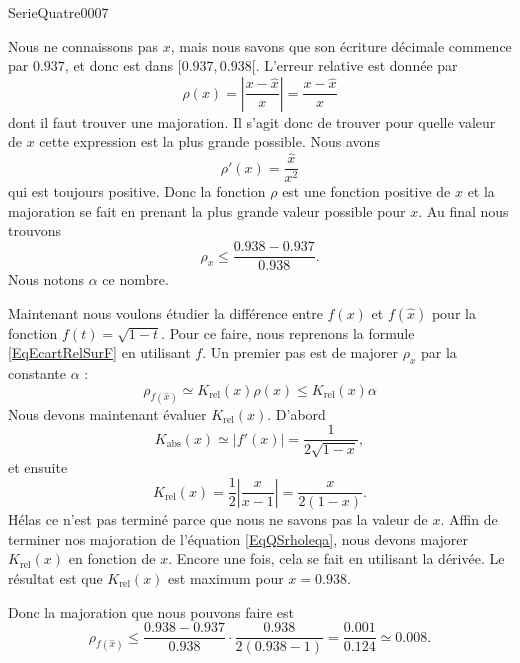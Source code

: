 
\begin{corrige}{SerieQuatre0007}

	Nous ne connaissons pas $x$, mais nous savons que son écriture décimale commence par $0.937$, et donc est dans $\mathopen[ 0.937 , 0.938 [$. L'erreur relative est donnée par
	\begin{equation}
		\rho(x)=\left| \frac{ x-\hat x }{ x }\right|=\frac{ x-\hat x }{ x }
	\end{equation}
	dont il faut trouver une majoration. Il s'agit donc de trouver pour quelle valeur de $x$ cette expression est la plus grande possible. Nous avons
	\begin{equation}
		\rho'(x)=\frac{ \hat x }{ x^2 }
	\end{equation}
	qui est toujours positive. Donc la fonction $\rho$ est une fonction positive de $x$ et la majoration se fait en prenant la plus grande valeur possible pour $x$. Au final nous trouvons
	\begin{equation}
		\rho_x\leq \frac{ 0.938-0.937 }{ 0.938 }.
	\end{equation}
	Nous notons $\alpha$ ce nombre.

	Maintenant nous voulons étudier la différence entre $f(x)$ et $f(\hat x)$ pour la fonction $f(t)=\sqrt{1-t}$. Pour ce faire, nous reprenons la formule \eqref{EqEcartRelSurF} en utilisant $f$. Un premier pas est de majorer $\rho_x$ par la constante $\alpha$ :
	\begin{equation}		\label{EqQSrholeqa}
		\rho_{f(\hat x)}\simeq K_{\text{rel}}(x)\rho(x)\leq K_{\text{rel}}(x)\alpha
	\end{equation}
	Nous devons maintenant évaluer $K_{\text{rel}}(x)$. D'abord
	\begin{equation}
		K_{\text{abs}}(x)\simeq| f'(x) |=\frac{1}{ 2\sqrt{1-x} },
	\end{equation}
	et ensuite
	\begin{equation}
		K_{\text{rel}}(x)=\frac{ 1}{2}\left| \frac{ x }{ x-1 } \right| =\frac{ x }{ 2(1-x) }.
	\end{equation}
	Hélas ce n'est pas terminé parce que nous ne savons pas la valeur de $x$. Affin de terminer nos majoration de l'équation \eqref{EqQSrholeqa}, nous devons majorer $K_{\text{rel}}(x)$ en fonction de $x$. Encore une fois, cela se fait en utilisant la dérivée. Le résultat est que $K_{\text{rel}}(x)$ est maximum pour $x=0.938$.

	Donc la majoration que nous pouvons faire est
	\begin{equation}
		\rho_{f(\hat x)}\leq \frac{ 0.938-0.937 }{ 0.938 }\cdot \frac{ 0.938 }{ 2(0.938-1) }=\frac{ 0.001 }{ 0.124 }\simeq 0.008.
	\end{equation}

\end{corrige}
